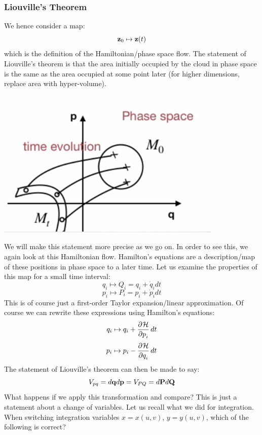 \documentclass[../PHYS306Notes.tex]{subfiles}
\begin{document}
\subsubsection{Liouville's Theorem}
We hence consider a map:
\[\mathbf{z}_0 \mapsto \mathbf{z}(t)\]
which is the definition of the Hamiltonian/phase space flow. The statement of Liouville's theorem is that the area initially occupied by the cloud in phase space is the same as the area occupied at some point later (for higher dimensions, replace area with hyper-volume). 
\begin{center}
    \includegraphics[scale=0.8]{Lecture-25/l25-img4.png}
\end{center}
We will make this statement more precise as we go on. In order to see this, we again look at this Hamiltonian flow. Hamilton's equations are a description/map of these positions in phase space to a later time. Let us examine the properties of this map for a small time interval:
\[q_i \mapsto Q_i = q_i + \dot{q}_idt\]
\[p_i \mapsto P_i = p_i + \dot{p}_idt\]
This is of course just a first-order Taylor expansion/linear approximation. Of course we can rewrite these expressions using Hamilton's equations:
\[q_i \mapsto q_i + \dpd{\HH}{p_i}dt\]
\[p_i \mapsto p_i - \dpd{\HH}{q_i}dt\]
The statement of Liouville's theorem can then be made to say:
\[V_{pq} = d\mathbf{q}d\mathbf{p} = V_{PQ} = d\mathbf{P}d\mathbf{Q}\]
What happens if we apply this transformation and compare? This is just a statement about a change of variables. Let us recall what we did for integration. When switching integration variables $x = x(u, v)$, $y = y(u, v)$, which of the following is correct?
\end{document}
